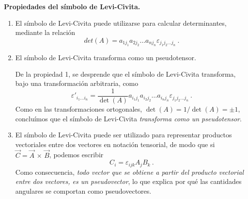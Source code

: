 \begin{propiedad}
    \textbf{Propiedades del símbolo de Levi-Civita.}

    \begin{enumerate}
        \item El símbolo de Levi-Civita puede utilizarse para calcular determinantes, mediante la relación
        \begin{equation}
            det(A) = a_{1 j_1} a_{2 j_2} \dots a_{n j_n} \varepsilon_{j_1 j_2 \dots j_n} \ .
        \end{equation}

        \item El símbolo de Levi-Civita transforma como un pseudotensor.
        
        De la propiedad 1, se desprende que el símbolo de Levi-Civita transforma, bajo una transformación arbitraria, como
        \begin{equation}
            \varepsilon'_{i_1 \dots i_n} = \frac{1}{\det(A)} a_{i_1 j_1} a_{i_2 j_2} \dots a_{i_n j_n} \varepsilon_{j_1 j_2 \dots j_n} \ .
        \end{equation}
        Como en las transformaciones ortogonales, $\det(A) = 1/\det(A) = \pm 1$, concluímos que el símbolo de Levi-Civita \emph{transforma como un pseudotensor}.

        \item El símbolo de Levi-Civita puede ser utilizado para representar productos vectoriales entre dos vectores en notación tensorial, de modo que si $\vec{C} = \vec{A} \, \times \, \vec{B}$, podemos escribir
        \begin{equation}
            C_i = \varepsilon_{ijk} A_j B_k \ .
        \end{equation}
        Como consecuencia, \emph{todo vector que se obtiene a partir del producto vectorial entre dos vectores, es un pseudovector}, lo que explica por qué las cantidades angulares se comportan como pseudovectores.


\end{enumerate}
\end{propiedad}
